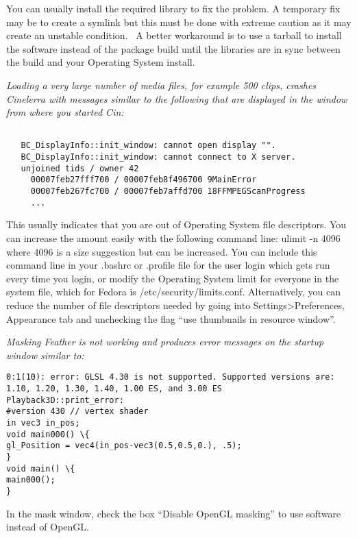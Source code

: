 You can usually install the required library to fix the problem. A temporary fix may be to create a symlink but this must be done with extreme caution as it may create an unstable condition. \ A better workaround is to use a tarball to install the software instead of the package build until the libraries are in sync between the build and your Operating System install.
\bigskip

\textit{ Loading a very large number of media files, for example 500 clips, crashes Cinelerra with messages similar to the following that are displayed in the window from where you started Cin:}
\medskip

\begin{lstlisting}[numbers=none,xleftmargin=10mm]

   BC_DisplayInfo::init_window: cannot open display "".
   BC_DisplayInfo::init_window: cannot connect to X server.
   unjoined tids / owner 42
     00007feb27fff700 / 00007feb8f496700 9MainError
     00007feb267fc700 / 00007feb7affd700 18FFMPEGScanProgress
     ... 

\end{lstlisting}

This usually indicates that you are out of Operating System file descriptors.  You can increase the amount easily with the following command line:  ulimit -n 4096   where 4096 is a size suggestion but can be increased.  You can include this command line in your .bashrc or .profile file for the user login which gets run every time you login, or modify the Operating System limit for everyone in the system file, which for Fedora is /etc/security/limits.conf.  Alternatively, you can reduce the number of file descriptors needed by going into Settings>Preferences, Appearance tab and unchecking the flag “use thumbnails in resource window”.

\bigskip
\textit{Masking Feather is not working and produces error messages on the startup window similar to:}
\medskip

\begin{lstlisting}[numbers=none,xleftmargin=10mm]
0:1(10): error: GLSL 4.30 is not supported. Supported versions are: 1.10, 1.20, 1.30, 1.40, 1.00 ES, and 3.00 ES
Playback3D::print_error:
#version 430 // vertex shader
in vec3 in_pos;
void main000() \{
gl_Position = vec4(in_pos-vec3(0.5,0.5,0.), .5);
}
void main() \{
main000();
}
\end{lstlisting}

In the mask window, check the box ``Disable OpenGL masking'' to use software instead of OpenGL.

